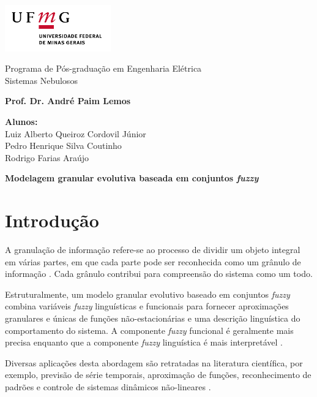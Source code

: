\documentclass[12pt, a4paper]{article}
\begin{document}
\begin{minipage}[c][3cm][c]{3cm}
\includegraphics[height=2cm]{ufmg.jpg}
\end{minipage}
\begin{minipage}[c][3cm][c]{10cm}
\center
{\sc Programa de Pós-graduação em Engenharia Elétrica}\\
{\sc Sistemas Nebulosos}

\textbf{\footnotesize{Prof. Dr. André Paim Lemos}}
\smallskip
\end{minipage}

\vspace{.5cm}

\noindent \textbf{Alunos:}\\ 
Luiz Alberto Queiroz Cordovil Júnior\\
Pedro Henrique Silva Coutinho\\
Rodrigo Farias Araújo\\
\begin{center}
\textbf{Modelagem granular evolutiva baseada em conjuntos \textit{fuzzy}} %
\end{center}

\section{Introdução}

\hspace{0.4cm} A granulação de informação refere-se ao processo de dividir um objeto integral em várias partes, em que cada parte pode ser reconhecida como um grânulo de informação \citep{yin2017}. Cada grânulo contribui para compreensão do sistema como um todo.

Estruturalmente, um modelo granular evolutivo baseado em conjuntos \textit{fuzzy} combina variáveis \textit{fuzzy} linguísticas e funcionais para fornecer aproximações granulares e únicas de funções não-estacionárias e uma descrição linguística do comportamento do sistema. A componente \textit{fuzzy} funcional é geralmente mais precisa enquanto que a componente \textit{fuzzy} linguística é mais interpretável \citep{leite2011}.

Diversas aplicações desta abordagem são retratadas na literatura científica, por exemplo, previsão de série temporais, aproximação de funções, reconhecimento de padrões e controle de sistemas dinâmicos não-lineares \citep{leite2015}.
\end{document}
